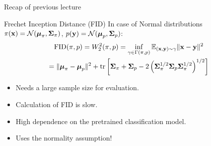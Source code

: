 

\begin{frame}
\titlepage
\end{frame}
\begin{frame}{Recap of previous lecture}
	\vspace{-0.3cm}
	\begin{block}{Frechet Inception Distance (FID)}
		In case of Normal distributions $\pi(\mathbf{x}) = \mathcal{N}(\boldsymbol{\mu}_\pi, \boldsymbol{\Sigma}_\pi)$, $p(\mathbf{y}) = \mathcal{N}(\boldsymbol{\mu}_p, \boldsymbol{\Sigma}_p)$:
		\vspace{-0.3cm}
		\begin{multline*}
			\text{FID} (\pi, p) =  W_2^2(\pi, p) = \inf_{\gamma \in \Gamma(\pi, p)} \mathbb{E}_{(\mathbf{x}, \mathbf{y}) \sim \gamma} \| \mathbf{x} - \mathbf{y} \|^2 \\
			= \| \boldsymbol{\mu}_{\pi} - \boldsymbol{\mu}_{p}\|^2 + \text{tr} \left[ \boldsymbol{\Sigma}_{\pi} + \boldsymbol{\Sigma}_p - 2 \left(\boldsymbol{\Sigma}_{\pi}^{1/2} \boldsymbol{\Sigma}_p \boldsymbol{\Sigma}_{\pi}^{1/2} \right)^{1/2} \right]
		\end{multline*}
		\vspace{-0.4cm}
	\end{block}
	\begin{itemize}
		\item Needs a large sample size for evaluation.
		\item Calculation of FID is slow.
		\item High dependence on the pretrained classification model.
		\item Uses the normality assumption!
	\end{itemize}
\end{frame}
